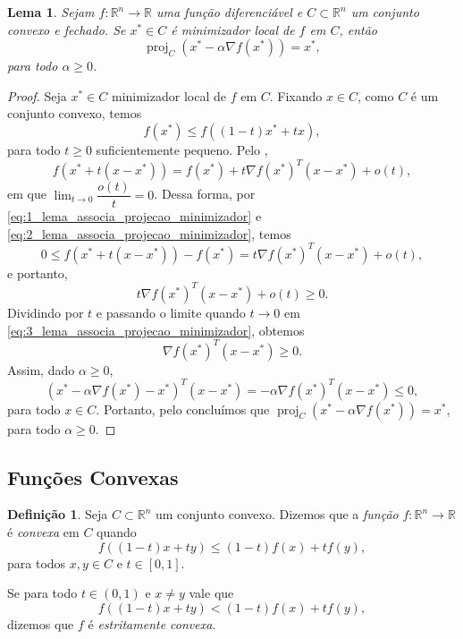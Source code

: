 \documentclass[12pt,a4paper]{scrartcl}
\DeclareMathOperator{\proj}{proj}
\def\RR{\mathds{R}}
\newtheorem{lema}{Lema}
\theoremstyle{definition}%
\newtheorem{defi}{Definição}
\begin{document}
\begin{lema} \label{lema:associa_projecao_minimizador}
Sejam $f: \RR^{n} \rightarrow \RR$ uma função diferenciável e $C \subset \RR^{n}$ um conjunto convexo e fechado. Se $x^{*} \in C$ é minimizador local de $f$ em $C$, então
\[
\proj_{C} (x^{*} - \alpha \nabla f(x^{*})) = x^{*} ,
\]
para todo $\alpha \geq 0$.
\end{lema}
\begin{proof}
Seja $x^{*} \in C$ minimizador local de $f$ em $C$. Fixando $x\in C$, como $C$ é um conjunto convexo, temos
\[ \label{eq:1_lema_associa_projecao_minimizador}
f(x^{*}) \leq f((1-t)x^{*} + tx),
\]
para todo $t\geq 0$ suficientemente pequeno. Pelo , 
\[ \label{eq:2_lema_associa_projecao_minimizador}
f(x^{*}+t(x-x^{*})) = f(x^{*}) + t\nabla f(x^{*})^{T}(x-x^{*}) + o(t) ,
\]
em que $\lim_{t\rightarrow 0} \dfrac{o(t)}{t} = 0$. Dessa forma, por \eqref{eq:1_lema_associa_projecao_minimizador} e \eqref{eq:2_lema_associa_projecao_minimizador}, temos
\[
0 \leq f(x^{*}+t(x-x^{*})) - f(x^{*}) = t\nabla f(x^{*})^{T}(x-x^{*}) + o(t) ,
\]
e portanto, 
\[ \label{eq:3_lema_associa_projecao_minimizador}
t\nabla f(x^{*})^{T}(x-x^{*}) + o(t) \geq 0.
\]
Dividindo por $t$ e passando o limite quando $t \rightarrow 0$ em \eqref{eq:3_lema_associa_projecao_minimizador}, obtemos
\[
\nabla f(x^{*})^{T}(x-x^{*}) \geq 0.
\]
Assim, dado $\alpha \geq 0$,
\[
(x^{*} - \alpha \nabla f(x^{*}) - x^{*})^{T}(x-x^{*}) = -\alpha \nabla f(x^{*})^{T}(x-x^{*}) \leq 0,
\]
para todo $x\in C$. Portanto, pelo  concluímos que $\proj_{C} (x^{*} - \alpha \nabla f(x^{*})) = x^{*}$, para todo $\alpha \geq 0$.
\end{proof}




\subsection{Funções Convexas}

\begin{defi} \label{defi:funcao_convexa}
Seja $C \subset \RR^{n}$ um conjunto convexo. Dizemos que a \emph{função} $f: \RR^{n} \rightarrow \RR$ é \emph{convexa} em $C$ quando
\[
f((1-t)x + ty) \leq (1-t)f(x) + tf(y),
\]
para todos $x,y \in C$ e $t \in [0,1]$.
\end{defi}
Se para todo $t \in (0,1)$ e $x \neq y$ vale que
\[
f((1-t)x + ty) < (1-t)f(x) + tf(y),
\]
dizemos que $f$ é \emph{estritamente convexa}.
\end{document}
